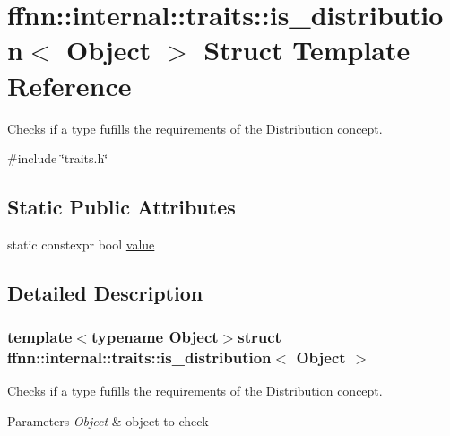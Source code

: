 \hypertarget{structffnn_1_1internal_1_1traits_1_1is__distribution}{\section{ffnn\-:\-:internal\-:\-:traits\-:\-:is\-\_\-distribution$<$ Object $>$ Struct Template Reference}
\label{structffnn_1_1internal_1_1traits_1_1is__distribution}
}


Checks if a type fufills the requirements of the Distribution concept.  




{\ttfamily \#include \char`\"{}traits.\-h\char`\"{}}

\subsection*{Static Public Attributes}
\begin{DoxyCompactItemize}
\item 
static constexpr bool \hyperlink{structffnn_1_1internal_1_1traits_1_1is__distribution_a7f4813ca467ef824a4f98c1d18442bfc}{value}
\end{DoxyCompactItemize}


\subsection{Detailed Description}
\subsubsection*{template$<$typename Object$>$struct ffnn\-::internal\-::traits\-::is\-\_\-distribution$<$ Object $>$}

Checks if a type fufills the requirements of the Distribution concept. 


\begin{DoxyParams}{Parameters}
{\em Object} & object to check \\
\hline
\end{DoxyParams}


